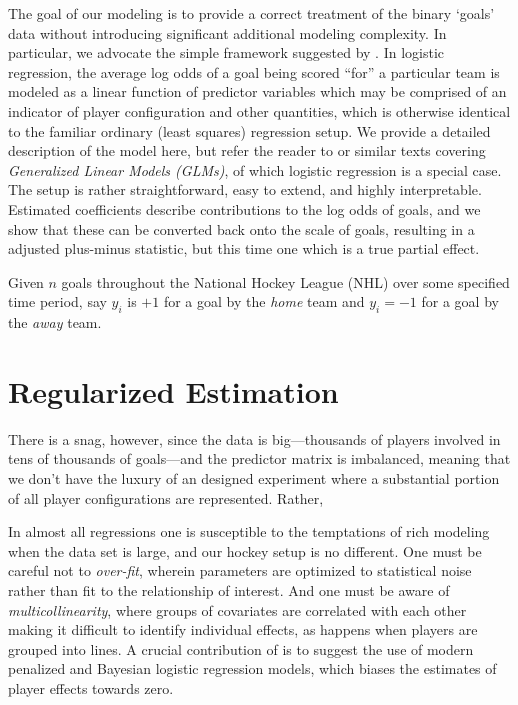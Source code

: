 The goal of our modeling is to provide a correct treatment of the binary
`goals' data without introducing significant additional modeling complexity.
In particular, we advocate the simple  framework
suggested by \cite{gramacy:jensen:taddy:2013}.  In logistic regression, the
average log odds of a goal being scored ``for'' a particular team  is modeled
as a linear function of predictor variables which may be comprised of an
indicator of player configuration and other quantities, which is otherwise
identical to the familiar ordinary (least squares) regression setup.  We
provide a detailed description of the model here, but refer the reader to
\cite{sheather:2009} or similar texts covering {\em Generalized Linear Models
(GLMs)}, of which logistic regression is a special case.
The setup is rather straightforward, easy to
extend, and highly interpretable.  Estimated coefficients describe
contributions to the log odds of goals, and we show that these can be
converted back onto the scale of goals, resulting in a adjusted plus-minus
statistic, but this time one which is a true partial effect.  

Given $n$ goals throughout the National Hockey League (NHL) over some
specified time period,  say $y_i$ is $+1$ for a goal by the \textit{home} team
and $y_i = -1$ for a goal by the \textit{away} team.

\section{Regularized Estimation}
\label{sec:regularization}

There is a snag,
however, since the data is big---thousands of players involved in tens of
thousands of goals---and the predictor matrix is imbalanced, meaning that we
don't have the luxury of an designed experiment where a substantial portion of
all player configurations are represented.  Rather, 

In almost all regressions one is susceptible to the temptations of rich
modeling when the data set is large, and our hockey setup is no different. One
must be careful not to {\em over-fit}, wherein parameters are optimized to
statistical noise rather than fit to the relationship of interest.  And one
must be aware of {\em multicollinearity}, where groups of covariates are
correlated with each other making it difficult to identify individual effects,
as happens when players are grouped into lines.  A crucial contribution of
\cite{gramacy:jensen:taddy:2013} is to suggest the use of modern penalized and
Bayesian logistic regression models, which biases the estimates of player
effects towards zero. 


